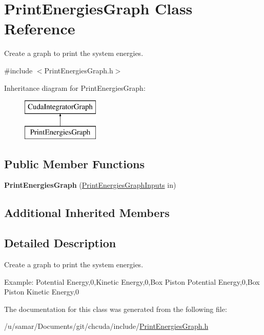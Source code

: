 \hypertarget{classPrintEnergiesGraph}{}\section{Print\+Energies\+Graph Class Reference}
\label{classPrintEnergiesGraph}


Create a graph to print the system energies.  




{\ttfamily \#include $<$Print\+Energies\+Graph.\+h$>$}

Inheritance diagram for Print\+Energies\+Graph\+:\begin{figure}[H]
\begin{center}
\leavevmode
\includegraphics[height=2.000000cm]{classPrintEnergiesGraph}
\end{center}
\end{figure}
\subsection*{Public Member Functions}
\begin{DoxyCompactItemize}
\item 
\hypertarget{classPrintEnergiesGraph_a0dc6851ffca92ab37548e4be1a3578ff}{}\label{classPrintEnergiesGraph_a0dc6851ffca92ab37548e4be1a3578ff} 
{\bfseries Print\+Energies\+Graph} (\hyperlink{structPrintEnergiesGraphInputs}{Print\+Energies\+Graph\+Inputs} in)
\end{DoxyCompactItemize}
\subsection*{Additional Inherited Members}


\subsection{Detailed Description}
Create a graph to print the system energies. 

Example\+: Potential Energy,0,Kinetic Energy,0,Box Piston Potential Energy,0,Box Piston Kinetic Energy,0 

The documentation for this class was generated from the following file\+:\begin{DoxyCompactItemize}
\item 
/u/samar/\+Documents/git/chcuda/include/\hyperlink{PrintEnergiesGraph_8h}{Print\+Energies\+Graph.\+h}\end{DoxyCompactItemize}
